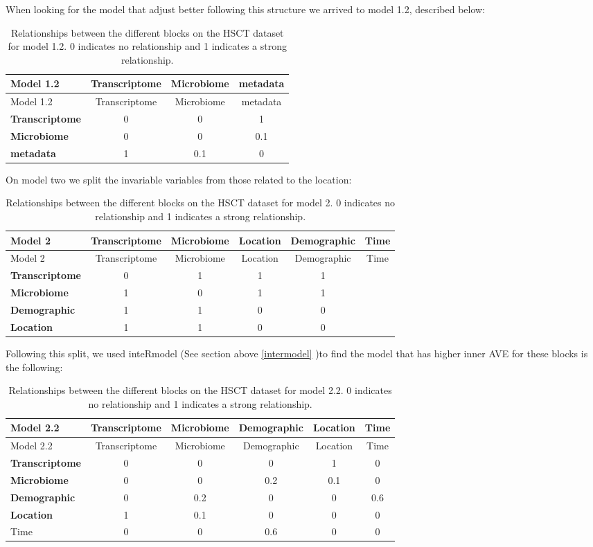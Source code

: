 \documentclass[
  a4paper,
]{book}
\begin{document}
When looking for the model that adjust better following this structure we arrived to model 1.2, described below:

\begin{longtable}[]{@{}lccc@{}}
\caption{\label{tab:hsct-model1-2} Relationships between the different blocks on the HSCT dataset for model 1.2. 0 indicates no relationship and 1 indicates a strong relationship.}\tabularnewline
\toprule
Model 1.2 & Transcriptome & Microbiome & metadata \\
\midrule
\endfirsthead
\toprule
Model 1.2 & Transcriptome & Microbiome & metadata \\
\midrule
\endhead
\textbf{Transcriptome} & 0 & 0 & 1 \\
\textbf{Microbiome} & 0 & 0 & 0.1 \\
\textbf{metadata} & 1 & 0.1 & 0 \\
\bottomrule
\end{longtable}

On model two we split the invariable variables from those related to the location:

\begin{longtable}[]{@{}lccccc@{}}
\caption{\label{tab:hsct-model2} Relationships between the different blocks on the HSCT dataset for model 2. 0 indicates no relationship and 1 indicates a strong relationship.}\tabularnewline
\toprule
Model 2 & Transcriptome & Microbiome & Location & Demographic & Time \\
\midrule
\endfirsthead
\toprule
Model 2 & Transcriptome & Microbiome & Location & Demographic & Time \\
\midrule
\endhead
\textbf{Transcriptome} & 0 & 1 & 1 & 1 & \\
\textbf{Microbiome} & 1 & 0 & 1 & 1 & \\
\textbf{Demographic} & 1 & 1 & 0 & 0 & \\
\textbf{Location} & 1 & 1 & 0 & 0 & \\
\bottomrule
\end{longtable}

Following this split, we used inteRmodel (See section above \ref{intermodel} )to find the model that has higher inner AVE for these blocks is the following:

\begin{longtable}[]{@{}lccccc@{}}
\caption{\label{tab:hsct-model2-2} Relationships between the different blocks on the HSCT dataset for model 2.2. 0 indicates no relationship and 1 indicates a strong relationship.}\tabularnewline
\toprule
Model 2.2 & Transcriptome & Microbiome & Demographic & Location & Time \\
\midrule
\endfirsthead
\toprule
Model 2.2 & Transcriptome & Microbiome & Demographic & Location & Time \\
\midrule
\endhead
\textbf{Transcriptome} & 0 & 0 & 0 & 1 & 0 \\
\textbf{Microbiome} & 0 & 0 & 0.2 & 0.1 & 0 \\
\textbf{Demographic} & 0 & 0.2 & 0 & 0 & 0.6 \\
\textbf{Location} & 1 & 0.1 & 0 & 0 & 0 \\
Time & 0 & 0 & 0.6 & 0 & 0 \\
\bottomrule
\end{longtable}
\end{document}
